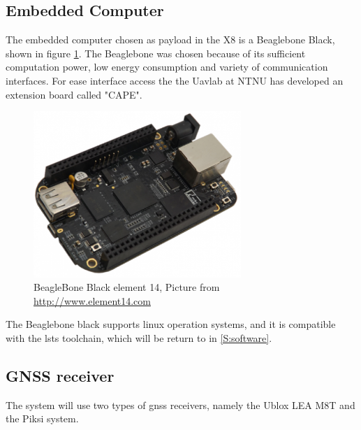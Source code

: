 \subsection{Embedded Computer}
The embedded computer chosen as payload in the X8 is a Beaglebone Black, shown in figure \ref{figure:BeagleBone}. The Beaglebone was chosen because of its sufficient computation power, low energy consumption and variety of communication interfaces. For ease interface access the  the Uavlab at NTNU has developed an extension board called "CAPE".
\begin{figure}[H]
	\centering
		\includegraphics[width=0.7\textwidth]{figs/BeagleBoneBlackE14.png}
		\caption{BeagleBone Black element 14, Picture from \url{http://www.element14.com}}
		\label{figure:BeagleBone}
\end{figure}
The Beaglebone black supports linux operation systems, and it is compatible with the \gls{lsts} toolchain, which will be return to in \ref{S:software}.
\subsection{GNSS receiver}
The system will use two types of \gls{gnss} receivers, namely the Ublox LEA M8T and the Piksi system. 
